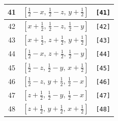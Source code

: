 \documentclass[fleqn,8pt]{jsarticle}
\begin{document}
\begin{longtable}{ccc}
41 & $\left[ \frac{1}{2} - x,\, \frac{1}{2} - z,\, y + \frac{1}{2} \right]$ & {\tt [41]} \\ \hline
42 & $\left[ x + \frac{1}{2},\, \frac{1}{2} - z,\, \frac{1}{2} - y \right]$ & {\tt [42]} \\ \hline
43 & $\left[ x + \frac{1}{2},\, z + \frac{1}{2},\, y + \frac{1}{2} \right]$ & {\tt [43]} \\ \hline
44 & $\left[ \frac{1}{2} - x,\, z + \frac{1}{2},\, \frac{1}{2} - y \right]$ & {\tt [44]} \\ \hline
45 & $\left[ \frac{1}{2} - z,\, \frac{1}{2} - y,\, x + \frac{1}{2} \right]$ & {\tt [45]} \\ \hline
46 & $\left[ \frac{1}{2} - z,\, y + \frac{1}{2},\, \frac{1}{2} - x \right]$ & {\tt [46]} \\ \hline
47 & $\left[ z + \frac{1}{2},\, \frac{1}{2} - y,\, \frac{1}{2} - x \right]$ & {\tt [47]} \\ \hline
48 & $\left[ z + \frac{1}{2},\, y + \frac{1}{2},\, x + \frac{1}{2} \right]$ & {\tt [48]} \\
\end{longtable}
\end{document}
